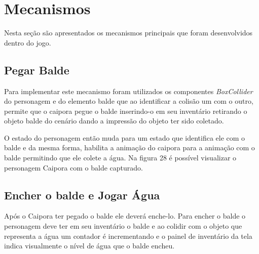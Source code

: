 \section{Mecanismos}

Nesta seção são apresentados os mecanismos principais que foram desenvolvidos dentro do jogo.

\subsection{Pegar Balde}

 Para implementar este mecanismo foram utilizados os componentes \textit{BoxCollider} do personagem e do elemento balde que ao identificar a colisão um com o outro, permite que o caipora pegue o balde inserindo-o em seu inventário retirando o objeto balde do cenário dando a impressão do objeto ter sido coletado.
 
 O estado do personagem então muda para um estado que identifica ele com o balde e da mesma forma, habilita a animação do caipora para a animação com o balde permitindo que ele colete a água. Na figura 28 é possível visualizar o personagem Caipora com o balde capturado.
 \pagebreak

\begin{figure}[h!]
		\centering
	\end{figure}
	
	
\subsection{Encher o balde e Jogar Água}
Após o Caipora ter pegado o balde ele deverá enche-lo. Para encher o balde o personagem deve ter em seu inventário o balde e ao colidir com o objeto que representa a água um contador é incrementando e o painel de inventário da tela indica visualmente o nível de água que o balde encheu. 

